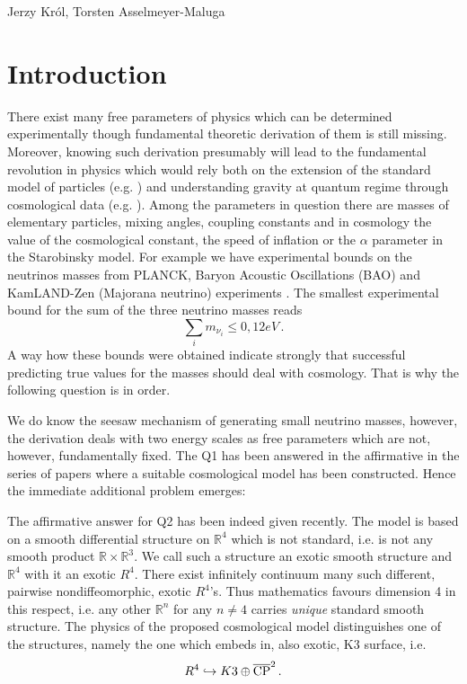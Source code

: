 \begin{artengenv2auth}{Jerzy Kr\'ol, Torsten Asselmeyer-Maluga}
\section{Introduction}
\lettrine[loversize=0.13,lines=2,lraise=-0.03,nindent=0em,findent=0.2pt]%
{T}{}here exist many free parameters of physics which can be determined experimentally though fundamental theoretic derivation of them is still missing. Moreover, knowing such derivation presumably will lead to the fundamental revolution in physics which would rely both on the extension of the standard model of particles (e.g. \cite{Weinberg2018}) and understanding gravity at quantum regime through cosmological data (e.g. \cite{Woodard2014}). Among the parameters in question there are masses of elementary particles, mixing angles, coupling constants and in cosmology the value of the cosmological constant, the speed of inflation or the $\alpha$ parameter in the Starobinsky model. For example we have experimental bounds on the neutrinos masses from PLANCK, Baryon Acoustic Oscillations (BAO) and KamLAND-Zen (Majorana neutrino) experiments \parencite{Neutrino-mass-KmLAND-Zen2016,PlanckCosmoParam2015,Neutrino2015}. The smallest experimental bound for the sum of the three neutrino masses reads
\[ \sum_i m_{\nu_i}\leq 0,12eV\,.\]
A way how these bounds were obtained indicate strongly that successful predicting true values for the masses should deal with cosmology. That is why the following question is in order.


We do know the seesaw mechanism of generating small neutrino masses, however, the derivation deals with two energy scales as free parameters which are not, however, fundamentally fixed. The Q1 has been answered in the affirmative in the series of papers \parencite{AK2018,AK2014,AK2019} where a suitable cosmological model has been constructed. Hence the immediate additional problem emerges:


The affirmative answer for Q2 has been indeed given recently. The model is based on a smooth differential structure on $\mathbb{R}^4$ which is not standard, i.e. is not any smooth product $\mathbb{R}\times\mathbb{R}^3$. We call such a structure an exotic smooth structure and $\mathbb{R}^4$ with it an exotic $R^4$. There exist infinitely continuum many such different, pairwise nondiffeomorphic, exotic $R^4$'s. Thus mathematics favours dimension 4 in this respect, i.e. any other $\mathbb{R}^n$ for any $n\neq 4$ carries {\em unique} standard smooth structure. The physics of the proposed cosmological model distinguishes one of the structures, namely the one which embeds in, also exotic, K3 surface, i.e.
\[R^4\hookrightarrow K3\oplus \overline{{\rm CP}}^2\,.  \]


\end{artengenv2auth}
